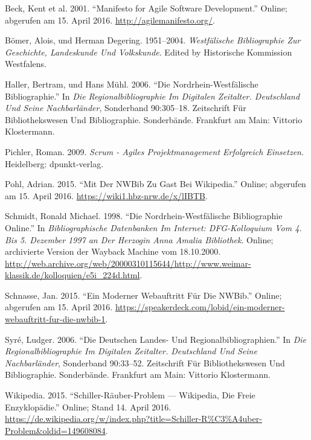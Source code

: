 \documentclass[a4paper,
fontsize=11pt,
oneside,
numbers=noperiodatend,
parskip=half-,
bibliography=totoc,
final
]{scrartcl}
\begin{document}
Beck, Kent et al. 2001. ``Manifesto for Agile Software Development.''
Online; abgerufen am 15. April 2016. \url{http://agilemanifesto.org/}.

Bömer, Alois, und Herman Degering. 1951--2004. \emph{Westfälische
Bibliographie Zur Geschichte, Landeskunde Und Volkskunde}. Edited by
Historische Kommission Westfalens.

Haller, Bertram, und Hans Mühl. 2006. ``Die Nord\-rhein-West\-fälische
Bibliographie.'' In \emph{Die Regionalbibliographie Im Digitalen
Zeitalter. Deutschland Und Seine Nachbarländer}, Sonderband 90:305--18.
Zeitschrift Für Bibliothekswesen Und Bibliographie. Sonderbände.
Frankfurt am Main: Vittorio Klostermann.

Pichler, Roman. 2009. \emph{Scrum - Agiles Projektmanagement Erfolgreich
Einsetzen}. Heidelberg: dpunkt-verlag.

Pohl, Adrian. 2015. ``Mit Der NWBib Zu Gast Bei Wikipedia.'' Online;
abgerufen am 15. April 2016. \url{https://wiki1.hbz-nrw.de/x/lIBTB}.

Schmidt, Ronald Michael. 1998. ``Die Nord\-rhein-West\-fälische
Bibliographie Online.'' In \emph{Bibliographische Datenbanken Im
Internet: DFG-Kolloquium Vom 4. Bis 5. Dezember 1997 an Der Herzogin
Anna Amalia Bibliothek}. Online; archivierte Version der Wayback Machine
vom 18.10.2000.
\url{http://web.archive.org/web/20000310115644/http://www.weimar-klassik.de/kolloquien/e5i_224d.html}.

Schnasse, Jan. 2015. ``Ein Moderner Webauftritt Für Die NWBib.'' Online;
abgerufen am 15. April 2016.
\url{https://speakerdeck.com/lobid/ein-moderner-webauftritt-fur-die-nwbib-1}.

Syré, Ludger. 2006. ``Die Deutschen Landes- Und
Regionalbibliographien.'' In \emph{Die Regionalbibliographie Im
Digitalen Zeitalter. Deutschland Und Seine Nachbarländer}, Sonderband
90:33--52. Zeitschrift Für Bibliothekswesen Und Bibliographie.
Sonderbände. Frankfurt am Main: Vittorio Klostermann.

Wikipedia. 2015. ``Schiller-Räuber-Problem --- Wikipedia, Die Freie
Enzyklopädie.'' Online; Stand 14. April 2016.
\url{https://de.wikipedia.org/w/index.php?title=Schiller-R%C3%A4uber-Problem&oldid=149608084}.
\end{document}
